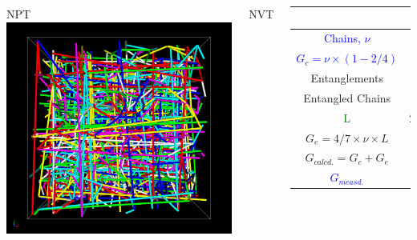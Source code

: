 \documentclass[aspectratio=169,11pt, dvipdfmx]{beamer}
\begin{document}
\begin{frame}
\begin{columns}[onlytextwidth]
            NPT
			\centering
				\includegraphics[width=\textwidth]{z_cord_4Chain.png}

                NVT

		\scriptsize
			\centering
			\begin{tabular}{c|c|c} \hline
				&NPT & NVT \\ \hline \hline
				\textcolor{blue}{Chains, $\nu$} & \multicolumn{2}{|c}{\textcolor{blue}{768, 0.018}}\\ \hline
				\textcolor{blue}{$G_c = \nu \times (1-2/4)$}&\multicolumn{2}{|c}{\textcolor{blue}{0.009}} \\ \hline \hline
				Entanglements& 278& 800\\ \hline
				Entangled Chains&249&557 \\ \hline
				\textcolor{green}{L} & \textcolor{green}{278/768=0.36} & \textcolor{green}{800/768=1.04} \\ \hline
				$G_e=4/7 \times \nu \times L $ & 0.004 & 0.011 \\ \hline \hline
				\alert{$G_{calcd.}=G_c + G_e$} & \alert{0.013} & \alert{0.020} \\ \hline \hline
				\textcolor{blue}{$G_{measd.}$} & \textcolor{blue}{0.013} & \textcolor{blue}{0.022} \\ \hline
			\end{tabular}
	\end{columns}
\end{frame}
\end{document}
